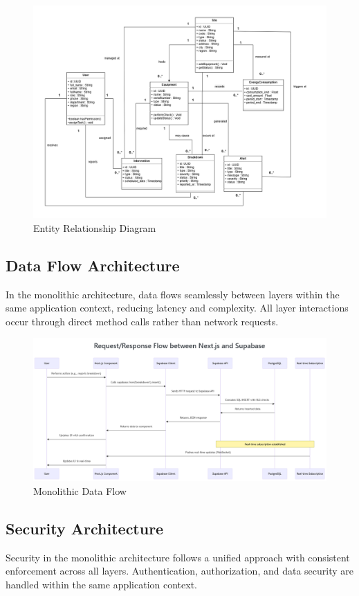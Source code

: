 \begin{figure}[hbt!]
    \centering
    \includegraphics[width=0.85\linewidth]{img/chap_02/database_er_diagram.png}
    \caption{Entity Relationship Diagram}
    \label{fig:database_er_diagram}
\end{figure}

\subsection{Data Flow Architecture}
In the monolithic architecture, data flows seamlessly between layers within the same application context, reducing latency and complexity. All layer interactions occur through direct method calls rather than network requests.

\begin{figure}[hbt!]
    \centering
    \includegraphics[width=0.9\linewidth]{img/chap_02/data_flow_architecture.png}
    \caption{Monolithic Data Flow}
    \label{fig:data_flow_architecture}
\end{figure}

\subsection{Security Architecture}
Security in the monolithic architecture follows a unified approach with consistent enforcement across all layers. Authentication, authorization, and data security are handled within the same application context.

